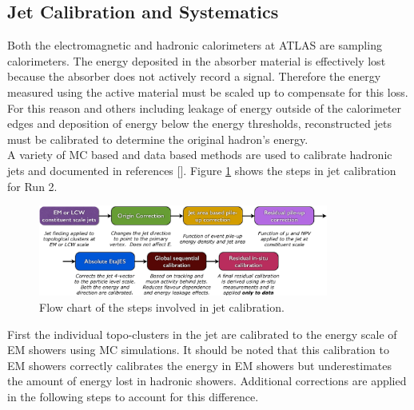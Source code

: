 \subsection{Jet Calibration and Systematics}
\label{sec:jet:calib}

\indent Both the electromagnetic and hadronic calorimeters at ATLAS are sampling calorimeters.  The energy deposited in the absorber material is effectively lost because the absorber does not actively record a signal.  Therefore the energy measured using the active material must be scaled up to compensate for this loss.  For this reason and others including leakage of energy outside of the calorimeter edges and deposition of energy below the energy thresholds, reconstructed jets must be calibrated to determine the original hadron's energy.  \\

\indent  A variety of MC based and data based methods are used to calibrate hadronic jets and documented in references [\cite{JetCalibration13TeV,JES_ZGamma,JES_dijet}].  Figure \ref{fig:jetCalibFlow} shows the steps in jet calibration for Run 2.\cite{JetCalibration13TeV} \\

\begin{figure}[h!]
  \begin{center}
    \includegraphics[width=0.85\textwidth]{figures/JetCalib/JetCalibFlow.png}\hspace{0.05\textwidth}
\end{center}
\caption[Flow chart of the steps involved in jet calibration]{Flow chart of the steps involved in jet calibration. }
\label{fig:jetCalibFlow} 
\end{figure}

\indent First the individual topo-clusters in the jet are calibrated to the energy scale of EM showers using MC simulations.\cite{JetCalibration13TeV}  It should be noted that this calibration to EM showers correctly calibrates the energy in EM showers but underestimates the amount of energy lost in hadronic showers.  Additional corrections are applied in the following steps to account for this difference. \\

